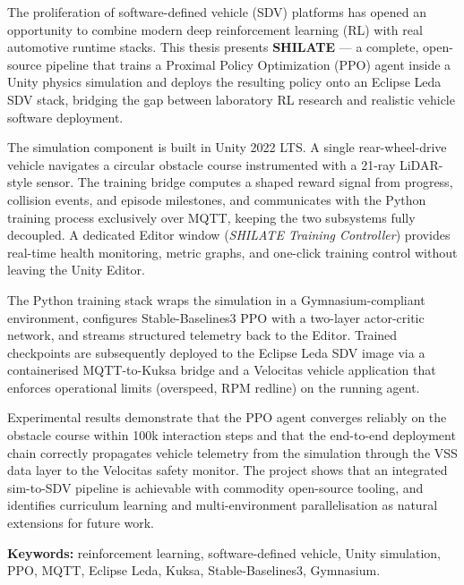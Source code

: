\documentclass[12pt,a4paper]{article}
\begin{document}
The proliferation of software-defined vehicle (SDV) platforms has opened an
opportunity to combine modern deep reinforcement learning (RL) with real
automotive runtime stacks. This thesis presents \textbf{SHILATE} --- a
complete, open-source pipeline that trains a Proximal Policy Optimization (PPO)
agent inside a Unity physics simulation and deploys the resulting policy onto an
Eclipse Leda SDV stack, bridging the gap between laboratory RL research and
realistic vehicle software deployment.

The simulation component is built in Unity 2022 LTS. A single rear-wheel-drive
vehicle navigates a circular obstacle course instrumented with a 21-ray
LiDAR-style sensor. The training bridge computes a shaped reward signal from
progress, collision events, and episode milestones, and communicates with the
Python training process exclusively over MQTT, keeping the two subsystems fully
decoupled. A dedicated Editor window (\emph{SHILATE Training Controller})
provides real-time health monitoring, metric graphs, and one-click training
control without leaving the Unity Editor.

The Python training stack wraps the simulation in a Gymnasium-compliant
environment, configures Stable-Baselines3 PPO with a two-layer actor-critic
network, and streams structured telemetry back to the Editor. Trained
checkpoints are subsequently deployed to the Eclipse Leda SDV image via a
containerised MQTT-to-Kuksa bridge and a Velocitas vehicle application that
enforces operational limits (overspeed, RPM redline) on the running agent.

Experimental results demonstrate that the PPO agent converges reliably on the
obstacle course within 100k interaction steps and that the end-to-end deployment
chain correctly propagates vehicle telemetry from the simulation through the
VSS data layer to the Velocitas safety monitor. The project shows that an
integrated sim-to-SDV pipeline is achievable with commodity open-source
tooling, and identifies curriculum learning and multi-environment
parallelisation as natural extensions for future work.

\textbf{Keywords:} reinforcement learning, software-defined vehicle, Unity
simulation, PPO, MQTT, Eclipse Leda, Kuksa, Stable-Baselines3, Gymnasium.

\clearpage

\pagestyle{fancy}
\tableofcontents
\clearpage
\end{document}
